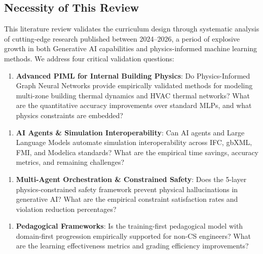 \documentclass[12pt,a4paper]{article}
\begin{document}
\subsection{Necessity of This Review}
This literature review validates the curriculum design through systematic analysis of cutting-edge research published between 2024--2026, a period of explosive growth in both Generative AI capabilities and physics-informed machine learning methods. We address four critical validation questions:
\begin{enumerate}
  \item \textbf{Advanced PIML for Internal Building Physics}: Do Physics-Informed Graph Neural Networks provide empirically validated methods for modeling multi-zone building thermal dynamics and HVAC thermal networks? What are the quantitative accuracy improvements over standard MLPs, and what physics constraints are embedded?
\end{enumerate}
\begin{enumerate}[resume]
  \item \textbf{AI Agents \& Simulation Interoperability}: Can AI agents and Large Language Models automate simulation interoperability across IFC, gbXML, FMI, and Modelica standards? What are the empirical time savings, accuracy metrics, and remaining challenges?
\end{enumerate}
\begin{enumerate}[resume]
  \item \textbf{Multi-Agent Orchestration \& Constrained Safety}: Does the 5-layer physics-constrained safety framework prevent physical hallucinations in generative AI? What are the empirical constraint satisfaction rates and violation reduction percentages?
\end{enumerate}
\begin{enumerate}[resume]
  \item \textbf{Pedagogical Frameworks}: Is the training-first pedagogical model with domain-first progression empirically supported for non-CS engineers? What are the learning effectiveness metrics and grading efficiency improvements?
\end{enumerate}
\end{document}
